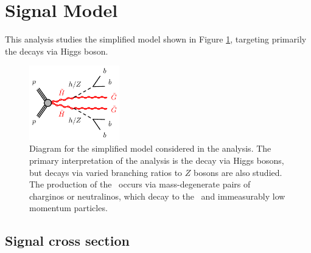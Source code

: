 
\section{Signal Model}

This analysis studies the simplified model shown in Figure \ref{fig:feyn}, targeting primarily the decays via Higgs boson. 

\begin{figure}[htbp]
	\centering
	\includegraphics[width=0.35\textwidth]{figures/ewk_prod/varie/N1N1-hhGG-bbbb_Z}
	\caption{Diagram for the simplified model considered in the analysis. The primary interpretation of the analysis is the decay via Higgs bosons, but decays via varied branching ratios to $Z$ bosons are also studied. The production of the \hino\ occurs
via mass-degenerate pairs of charginos or neutralinos, which decay to the \ninoone\ and immeasurably low momentum particles.} 
	\label{fig:feyn}
\end{figure}

\subsection{Signal cross section}


